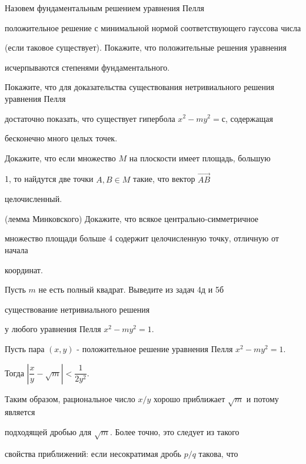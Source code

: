 \documentclass[a4paper,12pt]{article}
\begin{document}
 Назовем фундаментальным решением уравнения Пелля

положительное решение с минимальной нормой соответствующего гауссова числа

(если таковое существует). Покажите, что положительные решения уравнения

исчерпываются степенями фундаментального.



 \label{1}

Покажите, что для доказательства существования нетривиального решения уравнения Пелля

 достаточно показать, что существует гипербола $x^2-my^2=с$, содержащая

 бесконечно много целых точек.





 Докажите, что если множество $M$ на плоскости имеет площадь, большую

1, то найдутся две точки $A,B\in M$ такие, что вектор $\overrightarrow{AB}$

целочисленный.



 \label{2}(лемма Минковского) Докажите, что всякое центрально-симметричное

 множество площади больше 4 содержит целочисленную точку, отличную от начала

 координат.



 Пусть $m$ не есть полный квадрат. Выведите из  задач 4д и 5б

существование нетривиального решения

у любого уравнения Пелля $x^2-my^2=1$.






 Пусть пара $(x,y)$ - положительное решение уравнения Пелля $x^2-my^2=1$.

Тогда $\left|\dfrac{x}{y}-\sqrt{m}\right|<\dfrac{1}{2y^2}$.


Таким образом, рациональное число $x/y$ хорошо приближает $\sqrt{m}$ и потому является

подходящей дробью для  $\sqrt{m}$. Более точно, это следует из такого

свойства приближений: если несократимая дробь $p/q$ такова, что
\end{document}
